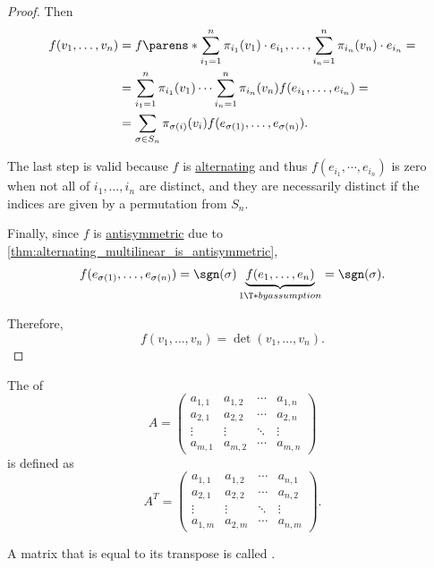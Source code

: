 \begin{proof}
  Then
  \begin{align*}
    f(v_1, \ldots, v_n)
    &=
    f\parens*{ \sum_{i_1=1}^n \pi_{i_1}(v_1) \cdot e_{i_1}, \ldots, \sum_{i_n=1}^n \pi_{i_n}(v_n) \cdot e_{i_n} }
    = \\ &=
    \sum_{i_1=1}^n \pi_{i_1}(v_1) \cdots \sum_{i_n=1}^n \pi_{i_n}(v_n) f(e_{i_1}, \ldots, e_{i_n})
    = \\ &=
    \sum_{\sigma \in S_n} \pi_{\sigma(i)}(v_i) f(e_{\sigma(1)}, \ldots, e_{\sigma(n)}).
  \end{align*}

  The last step is valid because \( f \) is \hyperref[def:alternating_function]{alternating} and thus \( f(e_{i_1}, \cdots, e_{i_n}) \) is zero when not all of \( i_1, \ldots, i_n \) are distinct, and they are necessarily distinct if the indices are given by a permutation from \( S_n \).

  Finally, since \( f \) is \hyperref[def:antisymmetric_function]{antisymmetric} due to \cref{thm:alternating_multilinear_is_antisymmetric},
  \begin{equation*}
    f(e_{\sigma(1)}, \ldots, e_{\sigma(n)}) = \sgn(\sigma) \underbrace{f(e_1, \ldots, e_n)}_{1 \T*{by assumption}} = \sgn(\sigma).
  \end{equation*}

  Therefore,
  \begin{equation*}
    f(v_1, \ldots, v_n) = \det(v_1, \ldots, v_n).
  \end{equation*}
\end{proof}

\begin{definition}\label{def:transpose_matrix}\mimprovised
  The  of
  \begin{equation*}
    A = \begin{pmatrix}
      a_{1,1} & a_{1,2} & \cdots & a_{1,n} \\
      a_{2,1} & a_{2,2} & \cdots & a_{2,n} \\
      \vdots  & \vdots  & \ddots & \vdots  \\
      a_{m,1} & a_{m,2} & \cdots & a_{m,n}
    \end{pmatrix}
  \end{equation*}
  is defined as
  \begin{equation*}
    A^T = \begin{pmatrix}
      a_{1,1} & a_{1,2} & \cdots & a_{n,1} \\
      a_{2,1} & a_{2,2} & \cdots & a_{n,2} \\
      \vdots  & \vdots  & \ddots & \vdots  \\
      a_{1,m} & a_{2,m} & \cdots & a_{n,m}
    \end{pmatrix}.
  \end{equation*}

  A matrix that is equal to its transpose is called .
\end{definition}

